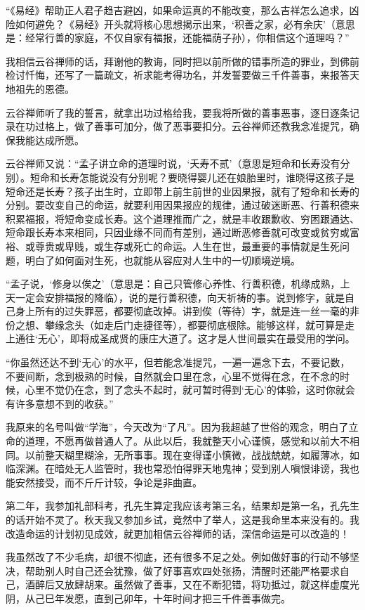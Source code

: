 \documentclass[12pt,UTF8]{ctexbook}
\begin{document}
“《易经》帮助正人君子趋吉避凶，如果命运真的不能改变，那么吉祥怎么追求，凶险如何避免？《易经》开头就将核心思想揭示出来，‘积善之家，必有余庆’（意思是：经常行善的家庭，不仅自家有福报，还能福荫子孙），你相信这个道理吗？”

我相信云谷禅师的话，拜谢他的教诲，同时把以前所做的错事所造的罪业，到佛前检讨忏悔，还写了一篇疏文，祈求能考得功名，并发誓要做三千件善事，来报答天地祖先的恩德。

云谷禅师听了我的誓言，就拿出功过格给我，要我将所做的善事恶事，逐日逐条记录在功过格上，做了善事可加分，做了恶事要扣分。云谷禅师还教我念准提咒，确保我能达成所愿。

云谷禅师又说：“孟子讲立命的道理时说，‘夭寿不贰’（意思是短命和长寿没有分别）。短命和长寿怎能说没有分别呢？要晓得婴儿还在娘胎里时，谁晓得这孩子是短命还是长寿？孩子出生时，立即带上前生前世的业因果报，就有了短命和长寿的分别。要改变自己的命运，就要利用因果报应的规律，通过破迷断恶、行善积德来积累福报，将短命变成长寿。这个道理推而广之，就是丰收跟歉收、穷困跟通达、短命跟长寿本来相同，只因业缘不同而有差别，通过断恶修善就可改变或贫穷或富裕、或尊贵或卑贱，或生存或死亡的命运。人生在世，最重要的事情就是生死问题，明白了如何面对生死，也就能从容应对人生中的一切顺境逆境。

“孟子说，‘修身以俟之’（意思是：自己只管修心养性、行善积德，机缘成熟，上天一定会安排福报的降临），说的是行善积德，向天祈祷的事。说到修字，就是自己身上所有的过失罪恶，都要彻底改掉。讲到俟（等待）字，就是连一丝一毫的非份之想、攀缘念头（如走后门走捷径等），都要彻底根除。能够这样，就可算是走上通往‘无心’，即将成圣成贤的康庄大道了。这才是人世间最实在最受用的学问。

“你虽然还达不到‘无心’的水平，但若能念准提咒，一遍一遍念下去，不要记数，不要间断，念到极熟的时候，自然就会口里在念，心里不觉得在念，在不念的时候，心里不觉仍在念，到了念头不起时，就可暂时得到‘无心’的体验，这时你就会有许多意想不到的收获。”

我原来的名号叫做“学海”，今天改为“了凡”。因为我超越了世俗的观念，明白了立命的道理，不愿再做普通人了。从此以后，我就整天小心谨慎，感觉和以前大不相同。以前整天糊里糊涂，无所事事。现在变得谨小慎微，战战兢兢，如履薄冰，如临深渊。在暗处无人监管时，我也常恐怕得罪天地鬼神；受到别人嗔恨诽谤，我也能安然接受，而不斤斤计较，争论是非曲直。

第二年，我参加礼部科考，孔先生算定我应该考第三名，结果却是第一名，孔先生的话开始不灵了。秋天我又参加乡试，竟然中了举人，这是我命里本来没有的。我改造命运的计划初见成效，就更加相信云谷禅师的话，深信命运是可以改造的！

我虽然改了不少毛病，却很不彻底，还有很多不足之处。例如做好事的行动不够坚决，帮助别人时自己还会犹豫，做了好事喜欢四处张扬，清醒时还能严格要求自己，酒醉后又放肆胡来。虽然做了善事，又在不断犯错，将功抵过，就这样虚度光阴，从己巳年发愿，直到己卯年，十年时间才把三千件善事做完。
\end{document}
